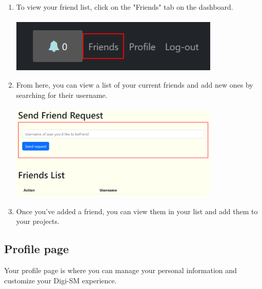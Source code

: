 \documentclass{article}
\begin{document}
\begin{enumerate}
    \item To view your friend list, click on the "Friends" tab on the dashboard.\\\\
    \includegraphics[width=10cm]{friendsNav.png}
    \item From here, you can view a list of your current friends and add new ones by searching for their username.\\\\
    \includegraphics[width=10cm]{friends.png}
    \item Once you've added a friend, you can view them in your list and add them to your projects.
\end{enumerate}

\newpage

\subsection{Profile page}

Your profile page is where you can manage your personal information and customize your Digi-SM experience. 
\end{document}
